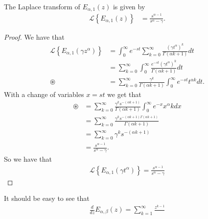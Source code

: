 \begin{lemma}
    The Laplace transform of $ E_{\alpha, 1}(z) $ is given by
    \begin{align}
        \mathcal{L} \left\{ E_{\alpha, 1}(z) \right\} &= \frac{s^{\alpha - 1}}{s^\alpha - \gamma}.
    \end{align}
\end{lemma}
\begin{proof}
    We have that
    \begin{align}
        \mathcal{L}\left\{ E_{\alpha, 1}(\gamma z^\alpha)\right\} &= \int_0^\infty e^{-st} \sum_{k=0}^\infty \frac{(\gamma t^\alpha)^k}{\Gamma(\alpha k + 1)} dt \\
        &= \sum_{k=0}^\infty \int_0^\infty \frac{e^{-st} (\gamma t^\alpha)^k}{\Gamma(\alpha k + 1)} dt \\
        \circledast &= \sum_{k=0}^\infty \frac{\gamma^k}{\Gamma(\alpha k + 1)}\int_0^\infty e^{-st}t^{\alpha k} dt.
    \end{align}
    With a change of variables $ x = st $ we get that
    \begin{align}
        \circledast &= \sum_{k=0}^\infty \frac{\gamma^k s^{-(\alpha k+1)}}{\Gamma(\alpha k + 1)} \int_0^\infty e^{-x} x^\alpha kdx \\
        &= \sum_{k=0}^\infty \frac{\gamma^k s^{-(\alpha k + 1)\Gamma(\alpha k + 1)}}{\Gamma(\alpha k + 1)} \\
        &= \sum_{k=0}^\infty \gamma^k s^{-(\alpha k+1)} \\
        &= \frac{s^{\alpha - 1}}{s^\alpha - \gamma}.
    \end{align}
    So we have that
    \begin{align}
        \mathcal{L}\left\{ E_{\alpha,1}( \gamma t^\alpha ) \right\} = \frac{s^{\alpha - 1}}{s^\alpha - \gamma}
    \end{align}
\end{proof}

It should be easy to see that 
\begin{align}
    \frac{d}{dz}E_{\alpha, \beta}(z) = \sum_{k=1}^\infty \frac{z^{k-1}}{}
\end{align}

\clearpage
